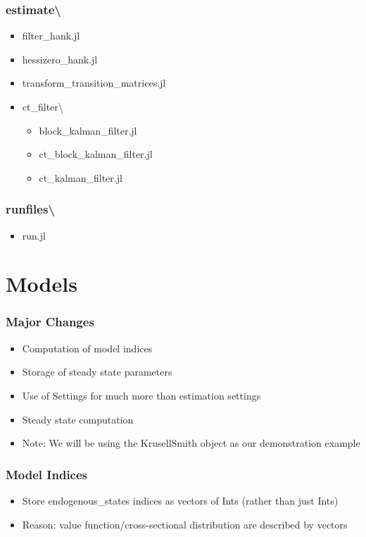 \documentclass{beamer}
\begin{document}
\begin{frame}
\frametitle{estimate\textbackslash}
\begin{itemize}
  \item filter\_hank.jl
  \item hessizero\_hank.jl
  \item transform\_transition\_matrices.jl
  \item  ct\_filter\textbackslash
  \begin{itemize}
    \item block\_kalman\_filter.jl
    \item ct\_block\_kalman\_filter.jl
    \item ct\_kalman\_filter.jl
  \end{itemize}
\end{itemize}
\end{frame}

\begin{frame}
\frametitle{runfiles\textbackslash}
  \begin{itemize}
    \item run.jl
  \end{itemize}
\end{frame}

\section{Models}

\begin{frame}
  \frametitle{Major Changes}
  \begin{itemize}
  \item Computation of model indices
  \item Storage of steady state parameters
  \item Use of Settings for much more than estimation settings
  \item Steady state computation
  \item Note: We will be using the KrusellSmith object as our demonstration example
  \end{itemize}
\end{frame}

\begin{frame}
  \frametitle{Model Indices}
  \begin{itemize}
  \item Store endogenous\_states indices as vectors of Ints (rather than just Ints)
  \item Reason: value function/cross-sectional distribution are described by vectors
  \end{itemize}
\end{frame}
\end{document}
